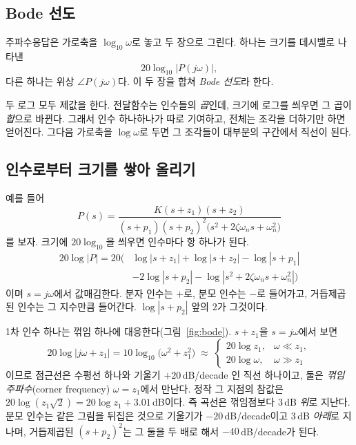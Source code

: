 \documentclass[11pt]{article}
\begin{document}
\subsection{Bode 선도}
주파수응답은 가로축을 $\log_{10}\omega$로 놓고 두 장으로 그린다. 하나는 크기를
데시벨로 나타낸
\[
   20\log_{10}|P(j\omega)| ,
\]
다른 하나는 위상 $\angle P(j\omega)$다. 이 두 장을 합쳐 \emph{Bode 선도}라 한다.

두 로그 모두 제값을 한다. 전달함수는 인수들의 \emph{곱}인데, 크기에 로그를 씌우면
그 곱이 \emph{합}으로 바뀐다. 그래서 인수 하나하나가 따로 기여하고, 전체는 조각을
더하기만 하면 얻어진다. 그다음 가로축을 $\log\omega$로 두면 그 조각들이 대부분의
구간에서 직선이 된다.

\subsection{인수로부터 크기를 쌓아 올리기}
예를 들어
\begin{equation}\label{eq:bodeex}
   P(s) = \frac{K(s+z_1)(s+z_2)}
               {(s+p_1)(s+p_2)^{2}\bigl(s^{2}+2\zeta\omega_n s+\omega_n^{2}\bigr)}
\end{equation}
를 보자. 크기에 $20\log_{10}$을 씌우면 인수마다 항 하나가 된다.
\begin{equation}\label{eq:bodesum}
\begin{aligned}
   20\log|P| = 20\bigl(&\log|s+z_1| + \log|s+z_2| - \log|s+p_1| \\
                       &- 2\log|s+p_2| - \log|s^{2}+2\zeta\omega_n s+\omega_n^{2}|\bigr)
\end{aligned}
\end{equation}
이며 $s=j\omega$에서 값매김한다. 분자 인수는 $+$로, 분모 인수는 $-$로 들어가고,
거듭제곱된 인수는 그 지수만큼 들어간다. $\log|s+p_2|$ 앞의 $2$가 그것이다.

1차 인수 하나는 꺾임 하나에 대응한다(그림~\ref{fig:bode}). $s+z_1$을
$s=j\omega$에서 보면
\[
   20\log|j\omega+z_1| = 10\log_{10}\bigl(\omega^{2}+z_1^{2}\bigr)
   \;\approx\;
   \begin{cases}
      20\log z_1, & \omega \ll z_1,\\[2pt]
      20\log \omega, & \omega \gg z_1
   \end{cases}
\]
이므로 점근선은 수평선 하나와 기울기 $+20$\,dB/decade 인 직선 하나이고, 둘은
\emph{꺾임 주파수}(corner frequency) $\omega=z_1$에서 만난다. 정작 그 지점의 참값은
$20\log(z_1\sqrt2) = 20\log z_1 + 3.01$\,dB이다. 즉 곡선은 꺾임점보다 $3$\,dB
\emph{위}로 지난다. 분모 인수는 같은 그림을 뒤집은 것으로 기울기가
$-20$\,dB/decade이고 $3$\,dB \emph{아래}로 지나며, 거듭제곱된 $(s+p_2)^{2}$는 그
둘을 두 배로 해서 $-40$\,dB/decade가 된다.
\end{document}

